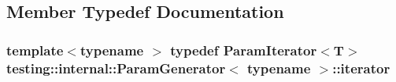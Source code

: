 \subsection{Member Typedef Documentation}
\hypertarget{classtesting_1_1internal_1_1_param_generator_ae54d0fb888817da53218c680919262fb}{
\subsubsection[{iterator}]{\setlength{\rightskip}{0pt plus 5cm}template$<$typename $>$ typedef {\bf Param\-Iterator}$<$T$>$ {\bf testing\-::internal\-::\-Param\-Generator}$<$ typename $>$\-::{\bf iterator}}}\label{classtesting_1_1internal_1_1_param_generator_ae54d0fb888817da53218c680919262fb}


